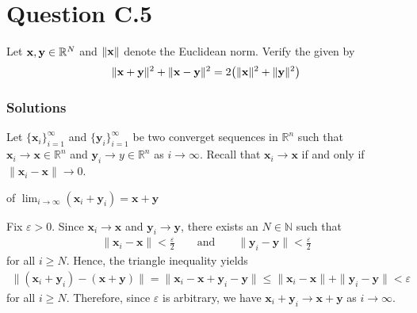 \documentclass[letterpaper,10pt,english]{jupyterBook}
\begin{document}
\section{Question C.5}
\label{\detokenize{04.exercises.C:question-c-5}}
\sphinxAtStartPar
Let \({\bf x}, {\bf y} \in \mathbb{R}^N\) and \(\| {\bf x} \| \) denote the Euclidean norm.  Verify the  given by
\begin{equation*}
\begin{split}
\| {\bf x} + {\bf y} \|^2 + \| {\bf x} - {\bf y} \|^2 = 2 \big( \| {\bf x} \|^2 + \| {\bf y} \|^2 \big)
\end{split}
\end{equation*}\subsubsection*{Solutions}

\sphinxAtStartPar
{}

\sphinxAtStartPar
Let \(\{\mathbf{x}_i\}_{i=1}^\infty\) and \(\{\mathbf{y}_i\}_{i=1}^\infty\) be two converget sequences in \(\mathbb{R}^n\) such that \(\mathbf{x}_i \to \mathbf{x} \in \mathbb{R}^n\) and \(\mathbf{y}_i \to y \in \mathbb{R}^n\) as \(i \to \infty\).
Recall that \(\mathbf{x}_i \to \mathbf{x}\) if and only if \(\|\mathbf{x}_i - \mathbf{x}\| \to 0\).

\sphinxAtStartPar
{} of \(\lim_{i \to \infty} (\mathbf{x}_i + \mathbf{y}_i) = \mathbf{x} + \mathbf{y}\)

\sphinxAtStartPar
Fix \(\varepsilon > 0\).
Since \(\mathbf{x}_i \to \mathbf{x}\) and \(\mathbf{y}_i \to \mathbf{y}\), there exists an \(N \in \mathbb{N}\) such that
\begin{equation*}
\begin{split}
\|\mathbf{x}_i - \mathbf{x}\| < \frac{\varepsilon}{2} \qquad \text{and} \qquad  \|\mathbf{y}_i - \mathbf{y}\| < \frac{\varepsilon}{2}
\end{split}
\end{equation*}
\sphinxAtStartPar
for all \(i \geq N\).
Hence, the triangle inequality yields
\begin{equation*}
\begin{split}
\|(\mathbf{x}_i + \mathbf{y}_i) - (\mathbf{x} + \mathbf{y})\| = \|\mathbf{x}_i - \mathbf{x} + \mathbf{y}_i - \mathbf{y}\| \leq \|\mathbf{x}_i - \mathbf{x}\| + \|\mathbf{y}_i - \mathbf{y}\|< \varepsilon
\end{split}
\end{equation*}
\sphinxAtStartPar
for all \(i \geq N\). Therefore, since \(\varepsilon\) is arbitrary, we have \(\mathbf{x}_i + \mathbf{y}_i \to \mathbf{x} + \mathbf{y}\) as \(i \to \infty\).
\end{document}
